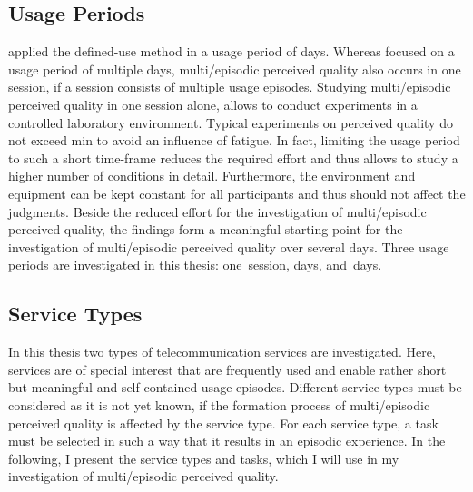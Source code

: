 \subsection{Usage Periods}
\citet{moller_single-call_2011} applied the defined-use method in a usage period of \unit[12]{days}. 
Whereas \citet{moller_single-call_2011} focused on a usage period of multiple days, multi\-/episodic perceived quality also occurs in one session, if a session consists of multiple usage episodes.
Studying multi\-/episodic perceived quality in one session alone, allows to conduct experiments in a controlled laboratory environment. %
Typical experiments on perceived quality do not exceed \unit[90]{min} to avoid an influence of fatigue.
In fact, limiting the usage period to such a short time-frame reduces the required effort and thus allows to study a higher number of conditions in detail.
Furthermore, the environment and equipment can be kept constant for all participants and thus should not affect the judgments.
Beside the reduced effort for the investigation of multi\-/episodic perceived quality, the findings form a meaningful starting point for the investigation of multi\-/episodic perceived quality over several days.
Three usage periods are investigated in this thesis: one~session, \unit[6]{days}, and~\unit[14]{days}.

\subsection{Service Types}
In this thesis two types of telecommunication services are investigated.
Here, services are of special interest that are frequently used and enable rather short but meaningful and self-contained usage episodes.
Different service types must be considered as it is not yet known, if the formation process of multi\-/episodic perceived quality is affected by the service type.
For each service type, a task must be selected in such a way that it results in an episodic experience.
In the following, I present the service types and tasks, which I will use in my investigation of multi\-/episodic perceived quality.

